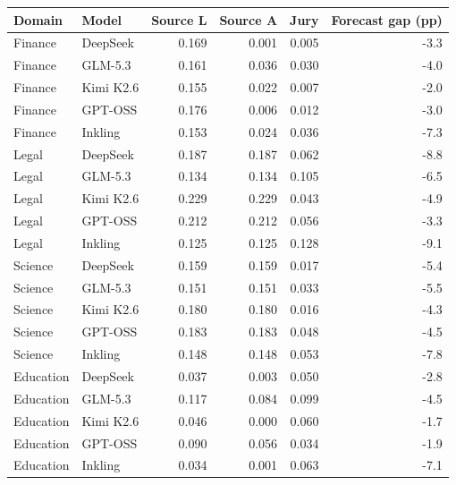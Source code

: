 \begin{tabular}{llrrrr}
\toprule
Domain & Model & Source L & Source A & Jury & Forecast gap (pp) \\
\midrule
Finance & DeepSeek & 0.169 & 0.001 & 0.005 & -3.3 \\
Finance & GLM-5.3 & 0.161 & 0.036 & 0.030 & -4.0 \\
Finance & Kimi K2.6 & 0.155 & 0.022 & 0.007 & -2.0 \\
Finance & GPT-OSS & 0.176 & 0.006 & 0.012 & -3.0 \\
Finance & Inkling & 0.153 & 0.024 & 0.036 & -7.3 \\
Legal & DeepSeek & 0.187 & 0.187 & 0.062 & -8.8 \\
Legal & GLM-5.3 & 0.134 & 0.134 & 0.105 & -6.5 \\
Legal & Kimi K2.6 & 0.229 & 0.229 & 0.043 & -4.9 \\
Legal & GPT-OSS & 0.212 & 0.212 & 0.056 & -3.3 \\
Legal & Inkling & 0.125 & 0.125 & 0.128 & -9.1 \\
Science & DeepSeek & 0.159 & 0.159 & 0.017 & -5.4 \\
Science & GLM-5.3 & 0.151 & 0.151 & 0.033 & -5.5 \\
Science & Kimi K2.6 & 0.180 & 0.180 & 0.016 & -4.3 \\
Science & GPT-OSS & 0.183 & 0.183 & 0.048 & -4.5 \\
Science & Inkling & 0.148 & 0.148 & 0.053 & -7.8 \\
Education & DeepSeek & 0.037 & 0.003 & 0.050 & -2.8 \\
Education & GLM-5.3 & 0.117 & 0.084 & 0.099 & -4.5 \\
Education & Kimi K2.6 & 0.046 & 0.000 & 0.060 & -1.7 \\
Education & GPT-OSS & 0.090 & 0.056 & 0.034 & -1.9 \\
Education & Inkling & 0.034 & 0.001 & 0.063 & -7.1 \\
\bottomrule
\end{tabular}
